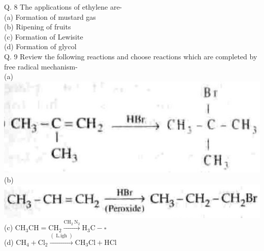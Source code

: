 \documentclass[10pt]{article}
\begin{document}
Q. 8 The applications of ethylene are-\\
(a) Formation of mustard gas\\
(b) Ripening of fruits\\
(c) Formation of Lewisite\\
(d) Formation of glycol\\
Q. 9 Review the following reactions and choose reactions which are completed by free radical mechanism-\\
(a)\\
\includegraphics[max width=\textwidth, center]{2025_01_28_8470952b98110cec3aabg-235}\\
(b)\\
\includegraphics[max width=\textwidth, center]{2025_01_28_8470952b98110cec3aabg-235(1)}\\
(c) $\mathrm{CH}_{3} \mathrm{CH}=\mathrm{CH}_{2} \xrightarrow{\mathrm{CH}_{2} \mathrm{~N}_{2}} \mathrm{H}_{3} \mathrm{C}-\square$\\
(d) $\mathrm{CH}_{4}+\mathrm{Cl}_{2} \xrightarrow{(\text { L.igh })} \mathrm{CH}_{3} \mathrm{Cl}+\mathrm{HCl}$
\end{document}
